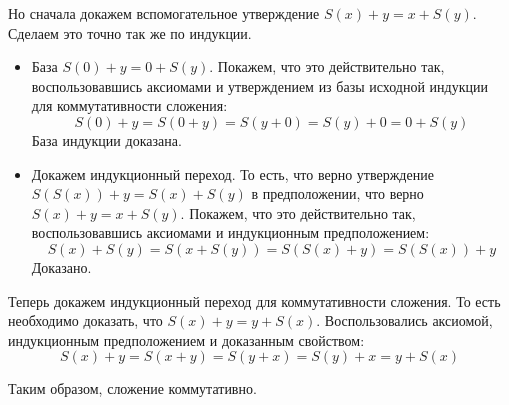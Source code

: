 \begin{enumerate}
\begin{itemize}
	Но сначала докажем вспомогательное утверждение $S(x) + y = x + S(y)$. Сделаем это точно так же по индукции.
	\begin{itemize}
		\item База $S(0) + y = 0 + S(y)$. Покажем, что это действительно так, воспользовавшись аксиомами и 
		утверждением из базы исходной индукции для коммутативности сложения:
		\begin{equation*}
			S(0) + y = S(0 + y) = S(y + 0) = S(y) + 0 = 0 + S(y)
		\end{equation*}
		База индукции доказана.
		\item Докажем индукционный переход. То есть, что верно утверждение $S(S(x)) + y = S(x) + S(y)$ в 
		предположении, что верно $S(x) + y = x + S(y)$. Покажем, что это действительно так, воспользовавшись 
		аксиомами и индукционным предположением:
		\begin{equation*}
			S(x) + S(y) = S(x + S(y)) = S(S(x) + y) = S(S(x)) + y
		\end{equation*}
		Доказано.
	\end{itemize}
	Теперь докажем индукционный переход для коммутативности сложения. То есть необходимо доказать, что $S(x) + y 
	= y + S(x)$. Воспользовались аксиомой, индукционным предположением и доказанным свойством:
	\begin{equation*}
		S(x) + y = S(x + y) = S(y + x) = S(y) + x = y + S(x)
 	\end{equation*}
\end{itemize}
Таким образом, сложение коммутативно.

\end{enumerate}

